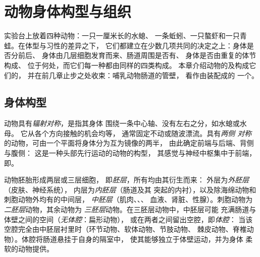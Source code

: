 \chapter{动物身体构型与组织}\label{ch:b1:body-plans-tissues}

实验台上放着四种动物：一只一厘米长的水螅、
一条蚯蚓、一只螯虾和一只青蛙。在体型与习性的差异之下，
它们都建立在少数几项共同的决定之上：身体是否分前后、
身体由几层细胞发育而来、肠道周围是否有、
身体是否由重复的体节构成、
位于何处，而它们每一种都由同样的四类构成。
本章介绍动物的及构成它们的，
并在前几章止步之处收束：哺乳动物肠道的管壁，
看作由装配成的
一个。

\section{身体构型}

\begin{definition}[对称性与头部集中化]\label{def:b1:body-plans-tissues:symmetry}
动物具有\emph{辐射对称}，是指其身体
围绕一条中心轴、没有左右之分，如水螅或水母。
它从各个方向接触的机会均等，
通常固定不动或随波漂流。具有\emph{两侧
对称}的动物，可由一个平面将身体分为互为镜像的两半，
由此确定前端与后端、背侧与腹侧：
这是一种头部先行运动的动物的构型，
其感觉与神经中枢集中于前端，
即。
\end{definition}

\begin{definition}[胚层与体腔]\label{def:b1:body-plans-tissues:layers}
动物胚胎形成两层或三层细胞，
即\emph{胚层}，所有均由其衍生而来：
外层为\emph{外胚层}（皮肤、神经系统），
内层为\emph{内胚层}（肠道及其
突起的内衬），以及除海绵动物和刺胞动物外均有的中间层，
\emph{中胚层}（肌肉、、、
血液、肾脏、性腺）。刺胞动物为\emph{二胚层}动物，其余动物为
\emph{三胚层}动物。在三胚层动物中，中胚层可能
充满肠道与体壁之间的空间（\emph{无体腔}：扁形动物），
或在两者之间留出空腔，即\emph{体腔}：
当该空腔完全由中胚层衬里时（环节动物、软体动物、节肢动物、
棘皮动物、脊椎动物）。体腔将肠道悬挂于自身的隔室中，
使其能够独立于体壁运动，并为身体
柔软的动物提供。
\end{definition}


